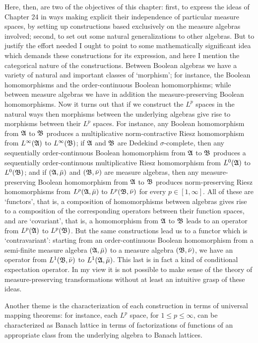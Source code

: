 Here, then, are two of the objectives of this chapter:  first, to
express the ideas of Chapter 24 in ways making explicit their
independence of particular measure spaces, by setting up constructions
based exclusively on the measure algebras involved;  second, to set out
some natural generalizations to other algebras.   But to justify the
effort needed I ought to point to some mathematically significant idea
which demands these constructions for its expression, and here I mention
the categorical nature of the constructions.   Between Boolean algebras
we have a variety of natural and important classes of \lq morphism';
for instance, the Boolean homomorphisms and the
order-continuous Boolean homomorphisms;  while between measure algebras
we have in addition the
measure-preserving Boolean homomorphisms.   Now it turns out that if we
construct the $L^p$ spaces in the natural ways then morphisms between
the underlying algebras give rise to morphisms between their $L^p$
spaces.   For instance, any Boolean homomorphism from $\frak A$ to
$\frak B$ produces a multiplicative norm-contractive Riesz homomorphism
from $L^{\infty}(\frak A)$ to $L^{\infty}(\frak B)$;  if $\frak A$ and
$\frak B$ are Dedekind $\sigma$-complete, then any sequentially
order-continuous Boolean homomorphism from $\frak A$ to $\frak B$
produces a sequentially order-continuous multiplicative Riesz
homomorphism from $L^0(\frak A)$ to $L^0(\frak B)$;  and if $(\frak
A,\bar\mu)$ and $(\frak B,\bar\nu)$ are measure algebras, then any
measure-preserving Boolean homomorphism from $\frak A$ to $\frak B$
produces norm-preserving Riesz homomorphisms from $L^p(\frak A,\bar\mu)$
to $L^p(\frak B,\bar\nu)$ for every $p\in[1,\infty]$.   All of
these are \lq functors', that is, a composition of homomorphisms between
algebras gives rise to a composition of the corresponding operators
between their function spaces, and are \lq covariant', that is, a
homomorphism from $\frak A$ to $\frak B$ leads to an operator from
$L^p(\frak A)$ to $L^p(\frak B)$.   But the same constructions lead us
to a functor which is \lq contravariant':  starting from an
order-continuous Boolean homomorphism from a semi-finite measure algebra
$(\frak A,\bar\mu)$ to a measure algebra $(\frak B,\bar\nu)$, we have an
operator from $L^1(\frak B,\bar\nu)$ to $L^1(\frak A,\bar\mu)$.   This
last is in fact a kind of conditional expectation operator.   In my view
it is not possible to make sense of the theory of measure-preserving
transformations without at least an intuitive grasp of these ideas.

Another theme is the characterization of each construction in terms of
universal mapping theorems:  for instance, each $L^p$ space, for $1\le
p\le\infty$, can be characterized as Banach lattice in terms of
factorizations of functions of an appropriate class from the underlying
algebra to Banach lattices.

